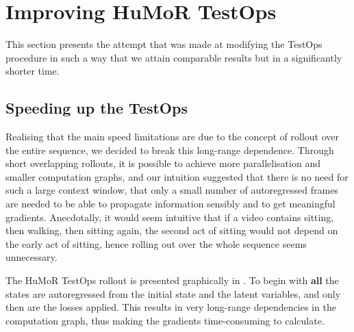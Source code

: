\section{Improving HuMoR TestOps}
\label{sec:humor_improvement}

This section presents the attempt that was made at modifying the TestOps procedure in such a way that we attain comparable results but in a significantly shorter time.

\subsection{Speeding up the TestOps}
\label{sec:humor_improvement_speed}

Realising that the main speed limitations are due to the concept of rollout over the entire sequence, we decided to break this long-range dependence. Through short overlapping rollouts, it is possible to achieve more parallelisation and smaller computation graphs, and our intuition suggested that there is no need for such a large context window, that only a small number of autoregressed frames are needed to be able to propagate information sensibly and to get meaningful gradients. Anecdotally, it would seem intuitive that if a video contains sitting, then walking, then sitting again, the second act of sitting would not depend on the early act of sitting, hence rolling out over the whole sequence seems unnecessary.

The HuMoR TestOps rollout is presented graphically in . To begin with \textbf{all} the states are autoregressed from the initial state and the latent variables, and only then are the losses applied. This results in very long-range dependencies in the computation graph, thus making the gradients time-consuming to calculate. 


